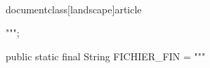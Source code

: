 \\documentclass[landscape]{article}
\begin{document}
    """;

    public static final String FICHIER_FIN =
    """
    \
\end{document}
